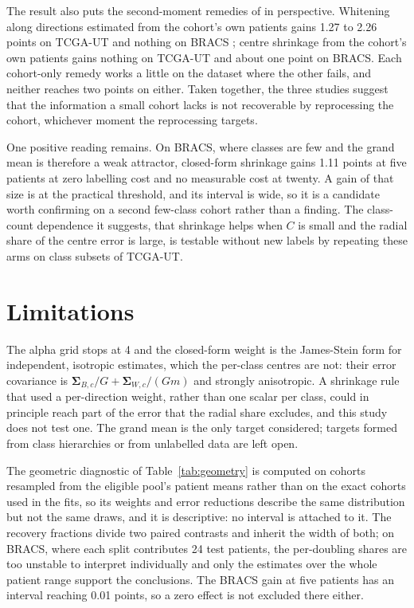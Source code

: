 \documentclass[11pt]{article}
\begin{document}
The result also puts the second-moment remedies of \citet{queisler2026patientDirections} in perspective. Whitening along directions estimated from the cohort's own patients gains 1.27 to 2.26 points on TCGA-UT and nothing on BRACS \citep{queisler2026bracsMechanism}; centre shrinkage from the cohort's own patients gains nothing on TCGA-UT and about one point on BRACS. Each cohort-only remedy works a little on the dataset where the other fails, and neither reaches two points on either. Taken together, the three studies suggest that the information a small cohort lacks is not recoverable by reprocessing the cohort, whichever moment the reprocessing targets.

One positive reading remains. On BRACS, where classes are few and the grand mean is therefore a weak attractor, closed-form shrinkage gains 1.11 points at five patients at zero labelling cost and no measurable cost at twenty. A gain of that size is at the practical threshold, and its interval is wide, so it is a candidate worth confirming on a second few-class cohort rather than a finding. The class-count dependence it suggests, that shrinkage helps when $C$ is small and the radial share of the centre error is large, is testable without new labels by repeating these arms on class subsets of TCGA-UT.

\section{Limitations}
\label{sec:limitations}
The alpha grid stops at 4 and the closed-form weight is the James-Stein form for independent, isotropic estimates, which the per-class centres are not: their error covariance is $\boldsymbol\Sigma_{B,c}/G+\boldsymbol\Sigma_{W,c}/(Gm)$ and strongly anisotropic. A shrinkage rule that used a per-direction weight, rather than one scalar per class, could in principle reach part of the error that the radial share excludes, and this study does not test one. The grand mean is the only target considered; targets formed from class hierarchies or from unlabelled data are left open.

The geometric diagnostic of Table~\ref{tab:geometry} is computed on cohorts resampled from the eligible pool's patient means rather than on the exact cohorts used in the fits, so its weights and error reductions describe the same distribution but not the same draws, and it is descriptive: no interval is attached to it. The recovery fractions divide two paired contrasts and inherit the width of both; on BRACS, where each split contributes 24 test patients, the per-doubling shares are too unstable to interpret individually and only the estimates over the whole patient range support the conclusions. The BRACS gain at five patients has an interval reaching 0.01 points, so a zero effect is not excluded there either.
\end{document}
